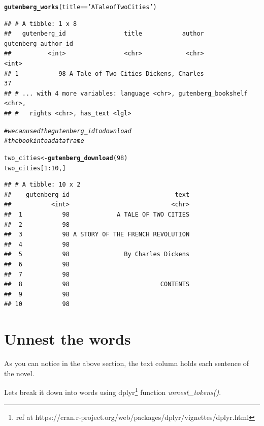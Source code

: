 \documentclass[12pt, letterpaper, twoside]{article}\usepackage[]{graphicx}\usepackage[]{color}
\makeatletter
\newcommand{\hlnum}[1]{\textcolor[rgb]{0.686,0.059,0.569}{#1}}%
\newcommand{\hlstr}[1]{\textcolor[rgb]{0.192,0.494,0.8}{#1}}%
\newcommand{\hlcom}[1]{\textcolor[rgb]{0.678,0.584,0.686}{\textit{#1}}}%
\newcommand{\hlopt}[1]{\textcolor[rgb]{0,0,0}{#1}}%
\newcommand{\hlstd}[1]{\textcolor[rgb]{0.345,0.345,0.345}{#1}}%
\newcommand{\hlkwb}[1]{\textcolor[rgb]{0.69,0.353,0.396}{#1}}%
\newcommand{\hlkwd}[1]{\textcolor[rgb]{0.737,0.353,0.396}{\textbf{#1}}}%
\newenvironment{kframe}{%
 \def\at@end@of@kframe{}%
 \ifinner\ifhmode%
  \def\at@end@of@kframe{\end{minipage}}%
  \begin{minipage}{\columnwidth}%
 \fi\fi%
 \def\FrameCommand##1{\hskip\@totalleftmargin \hskip-\fboxsep
 \colorbox{shadecolor}{##1}\hskip-\fboxsep
     \hskip-\linewidth \hskip-\@totalleftmargin \hskip\columnwidth}%
 \MakeFramed {\advance\hsize-\width
   \@totalleftmargin\z@ \linewidth\hsize
   \@setminipage}}%
 {\par\unskip\endMakeFramed%
 \at@end@of@kframe}
\newenvironment{knitrout}{}{} %
\makeatother
\begin{document}
\begin{knitrout}
\color{fgcolor}\begin{kframe}
\begin{alltt}
\hlkwd{gutenberg_works}\hlstd{(title}\hlopt{==}\hlstr{'A Tale of Two Cities'}\hlstd{)}
\end{alltt}
\begin{verbatim}
## # A tibble: 1 x 8
##   gutenberg_id                title           author gutenberg_author_id
##          <int>                <chr>            <chr>               <int>
## 1           98 A Tale of Two Cities Dickens, Charles                  37
## # ... with 4 more variables: language <chr>, gutenberg_bookshelf <chr>,
## #   rights <chr>, has_text <lgl>
\end{verbatim}
\begin{alltt}
\hlcom{# we can used the gutenberg_id to download}
\hlcom{# the book into a dataframe}

\hlstd{two_cities}\hlkwb{<-}\hlkwd{gutenberg_download}\hlstd{(}\hlnum{98}\hlstd{)}
\hlstd{two_cities[}\hlnum{1}\hlopt{:}\hlnum{10}\hlstd{,]}
\end{alltt}
\begin{verbatim}
## # A tibble: 10 x 2
##    gutenberg_id                             text
##           <int>                            <chr>
##  1           98             A TALE OF TWO CITIES
##  2           98                                 
##  3           98 A STORY OF THE FRENCH REVOLUTION
##  4           98                                 
##  5           98               By Charles Dickens
##  6           98                                 
##  7           98                                 
##  8           98                         CONTENTS
##  9           98                                 
## 10           98
\end{verbatim}
\end{kframe}
\end{knitrout}

\section{Unnest the words}
\noindent As you can notice in the above section, the text column holds each sentence of the novel. 

\noindent Lets break it down into words using dplyr\footnote{ ref at https://cran.r-project.org/web/packages/dplyr/vignettes/dplyr.html } function \emph{unnest\_tokens()}.
\end{document}

